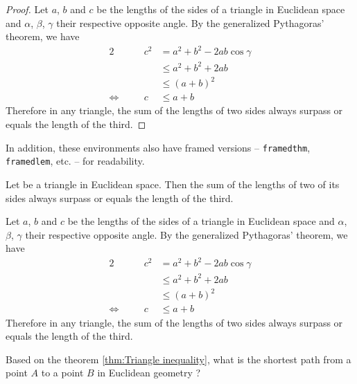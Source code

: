 \documentclass[./\jobname.tex]{subfiles}
\begin{document}
\begin{proof}
    Let $a$, $b$ and $c$ be the lengths of the sides of a triangle in Euclidean space and $\alpha$, $\beta$, $\gamma$ their respective opposite angle. By the generalized Pythagoras' theorem, we have
    \begin{alignat*}{2}
                                &  & c^2 & = a^2 + b^2 - 2ab \cos\gamma \\
                                &  &     & \leq a^2 + b^2 + 2ab         \\
                                &  &     & \leq (a + b)^2               \\
        \Leftrightarrow \quad &  & c   & \leq a + b
    \end{alignat*}
    Therefore in any triangle, the sum of the lengths of two sides always surpass or equals the length of the third.
\end{proof}

In addition, these environments also have framed versions -- \texttt{framedthm}, \texttt{framedlem}, etc. -- for readability.

\begin{framedthm}\label{thm:Triangle inequality}
    Let be a triangle in Euclidean space. Then the sum of the lengths of two of its sides always surpass or equals the length of the third.
\end{framedthm}

\begin{framedprf}
    Let $a$, $b$ and $c$ be the lengths of the sides of a triangle in Euclidean space and $\alpha$, $\beta$, $\gamma$ their respective opposite angle. By the generalized Pythagoras' theorem, we have
    \begin{alignat*}{2}
                                &  & c^2 & = a^2 + b^2 - 2ab \cos\gamma \\
                                &  &     & \leq a^2 + b^2 + 2ab         \\
                                &  &     & \leq (a + b)^2               \\
        \Leftrightarrow \quad &  & c   & \leq a + b
    \end{alignat*}
    Therefore in any triangle, the sum of the lengths of two sides always surpass or equals the length of the third. \qedadd
\end{framedprf}

\begin{framedquest*}
    Based on the theorem \ref{thm:Triangle inequality}, what is the shortest path from a point $A$ to a point $B$ in Euclidean geometry ?
\end{framedquest*}

\newpage
\end{document}
